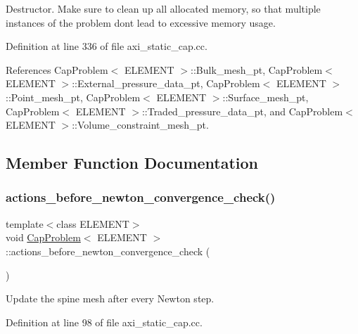 Destructor. Make sure to clean up all allocated memory, so that multiple instances of the problem don\textquotesingle{}t lead to excessive memory usage. 

Definition at line 336 of file axi\+\_\+static\+\_\+cap.\+cc.



References Cap\+Problem$<$ E\+L\+E\+M\+E\+N\+T $>$\+::\+Bulk\+\_\+mesh\+\_\+pt, Cap\+Problem$<$ E\+L\+E\+M\+E\+N\+T $>$\+::\+External\+\_\+pressure\+\_\+data\+\_\+pt, Cap\+Problem$<$ E\+L\+E\+M\+E\+N\+T $>$\+::\+Point\+\_\+mesh\+\_\+pt, Cap\+Problem$<$ E\+L\+E\+M\+E\+N\+T $>$\+::\+Surface\+\_\+mesh\+\_\+pt, Cap\+Problem$<$ E\+L\+E\+M\+E\+N\+T $>$\+::\+Traded\+\_\+pressure\+\_\+data\+\_\+pt, and Cap\+Problem$<$ E\+L\+E\+M\+E\+N\+T $>$\+::\+Volume\+\_\+constraint\+\_\+mesh\+\_\+pt.



\subsection{Member Function Documentation}
\mbox{\label{classCapProblem_ac852570b51489f4bf744b6063fbfa01a}} 
\subsubsection{\texorpdfstring{actions\+\_\+before\+\_\+newton\+\_\+convergence\+\_\+check()}{actions\_before\_newton\_convergence\_check()}}
{\footnotesize\ttfamily template$<$class E\+L\+E\+M\+E\+NT$>$ \\
void \hyperlink{classCapProblem}{Cap\+Problem}$<$ E\+L\+E\+M\+E\+NT $>$\+::actions\+\_\+before\+\_\+newton\+\_\+convergence\+\_\+check (\begin{DoxyParamCaption}{ }\end{DoxyParamCaption})\hspace{0.3cm}{\ttfamily [inline]}}



Update the spine mesh after every Newton step. 



Definition at line 98 of file axi\+\_\+static\+\_\+cap.\+cc.

